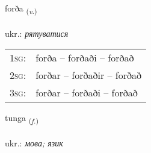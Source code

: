 \documentclass[frontgrid, backgrid]{flacards}\usepackage[]{graphicx}\usepackage[]{xcolor}
\begin{document}
{forða \small{\textsubscript{(\textit{v.})}} \\[1ex] %
\textphonetic{[fɔrða]} \\
ukr.: \emph{рятуватися} \\  [2ex]
\renewcommand*{\arraystretch}{0.8}
\begin{tabular}{p{1cm}l}
\textsc{1sg}: & forða -- forðaði -- forðað \\ 
\textsc{2sg}: & forðar -- forðaðir -- forðað \\ 
\textsc{3sg}: & forðar -- forðaði -- forðað \\ 
\end{tabular}
}

\renewcommand{\flhead}{\vskip5pt \fboxsep=0pt {\small\bfseries\footnotesize Nafnorð | іменник}}
\renewcommand{\fcfoot}{\vskip5pt \fboxsep=0pt \hspace{2pt}{\small\bfseries\footnotesize 2K}}

\renewcommand{\blhead}{\vskip5pt {\small\bfseries\footnotesize Nafnorð | іменник }}
\renewcommand{\bcfoot}{\vskip5pt \hspace{2pt}{\small\bfseries\footnotesize 2K}}


{tunga \small{\textsubscript{(\textit{f.})}} \\[1ex] %
\textphonetic{[tʰuŋka]} \\
ukr.: \emph{мова; язик} \\  [2ex]
\renewcommand*{\arraystretch}{0.8}
}

\renewcommand{\flhead}{\vskip5pt \fboxsep=0pt {\small\bfseries\footnotesize Nafnorð | іменник}}
\renewcommand{\fcfoot}{\vskip5pt \fboxsep=0pt \hspace{2pt}{\small\bfseries\footnotesize 2K}}
\end{document}
